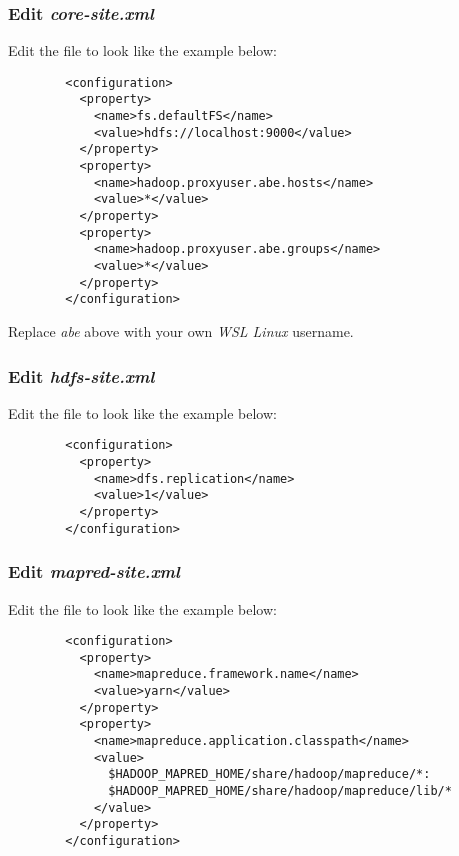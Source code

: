 \documentclass{article}
\begin{document}
        \subsubsection{Edit \emph{core-site.xml}}
        Edit the file  to look like the example below:
        \begin{verbatim}
        <configuration>
          <property>
            <name>fs.defaultFS</name>
            <value>hdfs://localhost:9000</value>
          </property>
          <property>
            <name>hadoop.proxyuser.abe.hosts</name>
            <value>*</value>
          </property>
          <property>
            <name>hadoop.proxyuser.abe.groups</name>
            <value>*</value>
          </property>
        </configuration>
        \end{verbatim}
        Replace \emph{abe} above with your own \emph{WSL Linux} username.

        \subsubsection{Edit \emph{hdfs-site.xml}}
        Edit the file  to look like the example below:
        \begin{verbatim}
        <configuration>
          <property>
            <name>dfs.replication</name>
            <value>1</value>
          </property>
        </configuration>
        \end{verbatim}
        
        \subsubsection{Edit \emph{mapred-site.xml}}
        Edit the file  to look like the example below:
        \begin{verbatim}
        <configuration>
          <property>
            <name>mapreduce.framework.name</name>
            <value>yarn</value>
          </property>
          <property>
            <name>mapreduce.application.classpath</name>
            <value>
              $HADOOP_MAPRED_HOME/share/hadoop/mapreduce/*:
              $HADOOP_MAPRED_HOME/share/hadoop/mapreduce/lib/*
            </value>
          </property>
        </configuration>
        \end{verbatim}
        
\end{document}

